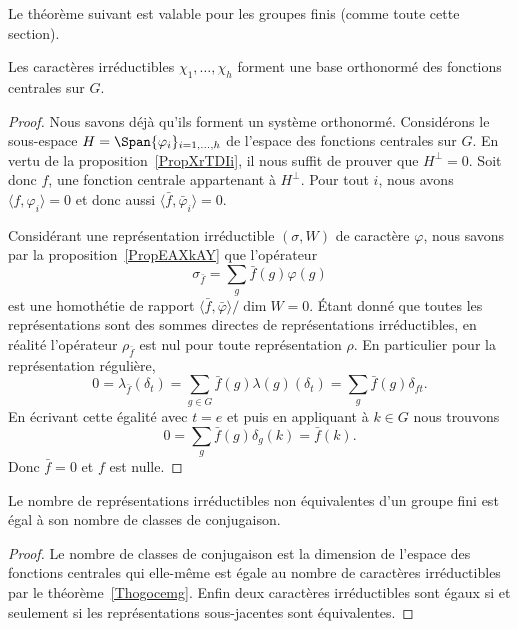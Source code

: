 Le théorème suivant est valable pour les groupes finis (comme toute cette section).
\begin{theorem}  \label{Thogocemg}
    Les caractères irréductibles \( \chi_1,\ldots, \chi_h\) forment une base orthonormé des fonctions centrales sur \( G\).
\end{theorem}

\begin{proof}
    Nous savons déjà qu'ils forment un système orthonormé. Considérons le sous-espace \( H=\Span\{ \varphi_i \}_{i=1,\ldots, h}\) de l'espace des fonctions centrales sur \( G\). En vertu de la proposition~\ref{PropXrTDIi}, il nous suffit de prouver que \( H^{\perp}=0\). Soit donc \( f\), une fonction centrale appartenant à \( H^{\perp}\). Pour tout \( i\), nous avons \( \langle f, \varphi_i\rangle =0\) et donc aussi \( \langle \bar f, \bar\varphi_i\rangle =0\).

    Considérant une représentation irréductible \( (\sigma,W)\) de caractère \( \varphi\), nous savons par la proposition~\ref{PropEAXkAY} que l'opérateur
    \begin{equation}
        \sigma_{\bar f}=\sum_g\bar f(g)\varphi(g)
    \end{equation}
    est une homothétie de rapport \( \langle \bar f, \bar\varphi\rangle/\dim W=0\). Étant donné que toutes les représentations sont des sommes directes de représentations irréductibles, en réalité l'opérateur \( \rho_{\bar f}\) est nul pour toute représentation \( \rho\). En particulier pour la représentation régulière,
    \begin{equation}
        0=\lambda_{\bar f}(\delta_t)=\sum_{g\in G}\bar f(g)\lambda(g)(\delta_t)=\sum_g\bar f(g)\delta_{ft}.
    \end{equation}
    En écrivant cette égalité avec \( t=e\) et puis en appliquant à \( k\in G\) nous trouvons
    \begin{equation}
        0=\sum_g\bar f(g)\delta_g(k)=\bar f(k).
    \end{equation}
    Donc \( \bar f=0\) et \( f\) est nulle.
\end{proof}

\begin{corollary}   \label{CorbdcVNC}
    Le nombre de représentations irréductibles non équivalentes d'un groupe fini est égal à son nombre de classes de conjugaison.
\end{corollary}

\begin{proof}
    Le nombre de classes de conjugaison est la dimension de l'espace des fonctions centrales qui elle-même est égale au nombre de caractères irréductibles par le théorème~\ref{Thogocemg}. Enfin deux caractères irréductibles sont égaux si et seulement si les représentations sous-jacentes sont équivalentes.
\end{proof}

